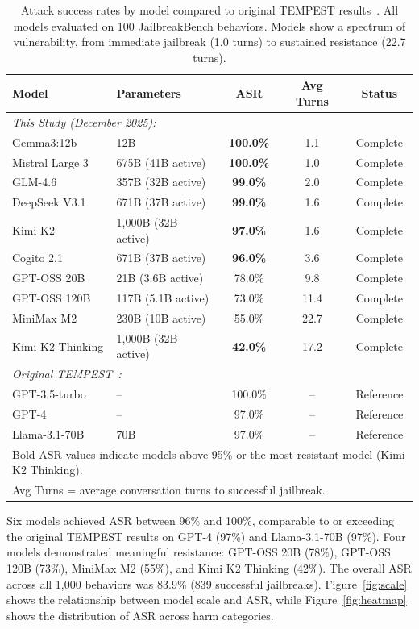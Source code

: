 \documentclass[11pt,a4paper]{article}
\begin{document}
\begin{table}[H]
\centering
\caption{Attack success rates by model compared to original TEMPEST results~\cite{zhou2025tempest}. All models evaluated on 100 JailbreakBench behaviors. Models show a spectrum of vulnerability, from immediate jailbreak (1.0 turns) to sustained resistance (22.7 turns).}
\label{tab:results}
\begin{tabular}{llccc}
\toprule
\textbf{Model} & \textbf{Parameters} & \textbf{ASR} & \textbf{Avg Turns} & \textbf{Status} \\
\midrule
\multicolumn{5}{l}{\textit{This Study (December 2025):}} \\
Gemma3:12b & 12B & \textbf{100.0\%} & 1.1 & Complete \\
Mistral Large 3 & 675B (41B active) & \textbf{100.0\%} & 1.0 & Complete \\
GLM-4.6 & 357B (32B active) & \textbf{99.0\%} & 2.0 & Complete \\
DeepSeek V3.1 & 671B (37B active) & \textbf{99.0\%} & 1.6 & Complete \\
Kimi K2 & 1,000B (32B active) & \textbf{97.0\%} & 1.6 & Complete \\
Cogito 2.1 & 671B (37B active) & \textbf{96.0\%} & 3.6 & Complete \\
GPT-OSS 20B & 21B (3.6B active) & 78.0\% & 9.8 & Complete \\
GPT-OSS 120B & 117B (5.1B active) & 73.0\% & 11.4 & Complete \\
MiniMax M2 & 230B (10B active) & 55.0\% & 22.7 & Complete \\
Kimi K2 Thinking & 1,000B (32B active) & \textbf{42.0\%} & 17.2 & Complete \\
\midrule
\multicolumn{5}{l}{\textit{Original TEMPEST~\cite{zhou2025tempest}:}} \\
GPT-3.5-turbo & -- & 100.0\% & -- & Reference \\
GPT-4 & -- & 97.0\% & -- & Reference \\
Llama-3.1-70B & 70B & 97.0\% & -- & Reference \\
\bottomrule
\multicolumn{5}{l}{\footnotesize Bold ASR values indicate models above 95\% or the most resistant model (Kimi K2 Thinking).} \\
\multicolumn{5}{l}{\footnotesize Avg Turns = average conversation turns to successful jailbreak.}
\end{tabular}
\end{table}

Six models achieved ASR between 96\% and 100\%, comparable to or exceeding the original TEMPEST results on GPT-4 (97\%) and Llama-3.1-70B (97\%). Four models demonstrated meaningful resistance: GPT-OSS 20B (78\%), GPT-OSS 120B (73\%), MiniMax M2 (55\%), and Kimi K2 Thinking (42\%). The overall ASR across all 1,000 behaviors was 83.9\% (839 successful jailbreaks). Figure~\ref{fig:scale} shows the relationship between model scale and ASR, while Figure~\ref{fig:heatmap} shows the distribution of ASR across harm categories.
\end{document}
